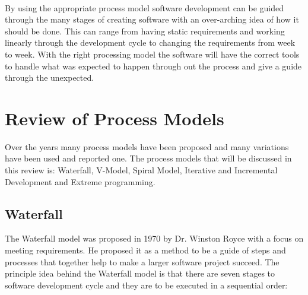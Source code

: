 \documentclass{style/CRPITStyle}
\renewcommand{\cite}{\citep}
\begin{document}
\paragraph{} %

By using the appropriate process model software development can be guided
through the many stages of creating software with an over-arching idea of how it
should be done. This can range from having static requirements and working
linearly through the development cycle to changing the requirements from week to
week. With the right processing model the software will have the correct tools
to handle what was expected to happen through out the process and give a guide
through the unexpected.


\section{Review of Process Models}

Over the years many process models have been proposed and many variations have
been used and reported one. The process models that will be discussed in this
review is: Waterfall, V-Model, Spiral Model, Iterative and Incremental Development and
Extreme programming.

\subsection{Waterfall} %

The Waterfall model was proposed in 1970 by Dr. Winston Royce \cite{royce:1970:waterfall} 
with a focus on meeting requirements.
He proposed it as a method to be a guide of steps and processes that together
help to make a larger software project succeed. 
The principle idea behind the Waterfall model is that there are seven stages to
software development cycle and they are to be executed in a sequential order:
\end{document}
